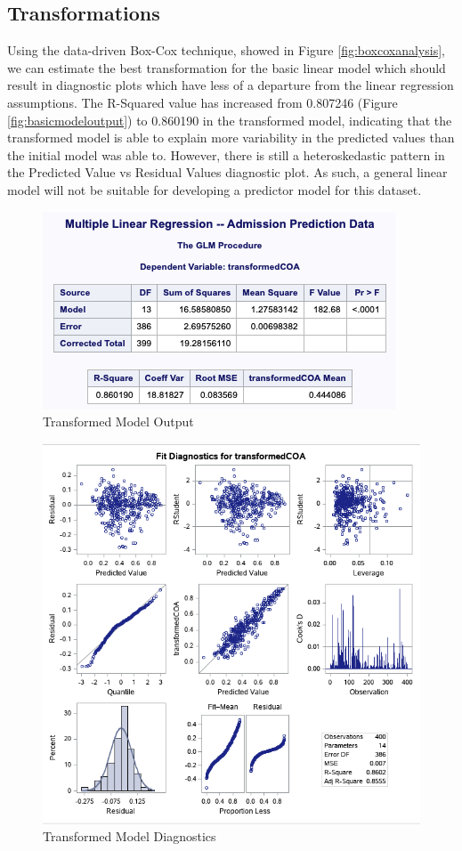 \documentclass{article}
\begin{document}
\subsection*{Transformations}
Using the data-driven Box-Cox technique, showed in Figure \ref{fig:boxcoxanalysis}, we can estimate the best transformation for the basic linear model which should result in diagnostic plots which have less of a departure from the linear regression assumptions. The R-Squared value has increased from 0.807246 (Figure \ref{fig:basicmodeloutput}) to 0.860190 in the transformed model, indicating that the transformed model is able to explain more variability in the predicted values than the initial model was able to. However, there is still a heteroskedastic pattern in the Predicted Value vs Residual Values diagnostic plot. As such, a general linear model will not be suitable for developing a predictor model for this dataset.

\begin{figure}
\centering
\includegraphics[scale=0.6]{transformed_model_output.png}
\caption{Transformed Model Output}
\label{fig:transformedmodeloutput}
\end{figure}


\begin{figure}
\centering
\includegraphics[scale=0.6]{transformed_model_diagnostics.png}
\caption{Transformed Model Diagnostics}
\label{fig:transformedmodeldiagnostics}
\end{figure}
\end{document}
